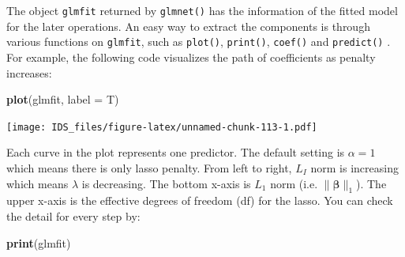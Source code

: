 \documentclass[12pt,]{krantz}
\makeatletter
\newenvironment{Shaded}{\begin{snugshade}}{\end{snugshade}}
\newcommand{\CommentTok}[1]{\textcolor[rgb]{0.37,0.37,0.37}{\textit{#1}}}
\newcommand{\DataTypeTok}[1]{\textcolor[rgb]{0.27,0.27,0.27}{#1}}
\newcommand{\DecValTok}[1]{\textcolor[rgb]{0.06,0.06,0.06}{#1}}
\newcommand{\KeywordTok}[1]{\textcolor[rgb]{0.27,0.27,0.27}{\textbf{#1}}}
\newcommand{\NormalTok}[1]{#1}
\newcommand{\OperatorTok}[1]{\textcolor[rgb]{0.43,0.43,0.43}{\textbf{#1}}}
\newcommand{\StringTok}[1]{\textcolor[rgb]{0.5,0.5,0.5}{#1}}
\newenvironment{kframe}{%
\medskip{}
\setlength{\fboxsep}{.8em}
 \def\at@end@of@kframe{}%
 \ifinner\ifhmode%
  \def\at@end@of@kframe{\end{minipage}}%
  \begin{minipage}{\columnwidth}%
 \fi\fi%
 \def\FrameCommand##1{\hskip\@totalleftmargin \hskip-\fboxsep
 \colorbox{shadecolor}{##1}\hskip-\fboxsep
     \hskip-\linewidth \hskip-\@totalleftmargin \hskip\columnwidth}%
 \MakeFramed {\advance\hsize-\width
   \@totalleftmargin\z@ \linewidth\hsize
   \@setminipage}}%
 {\par\unskip\endMakeFramed%
 \at@end@of@kframe}
\renewenvironment{Shaded}{\begin{kframe}}{\end{kframe}}
\makeatother
\begin{document}
\begin{Shaded}
\end{Shaded}

The object \texttt{glmfit} returned by \texttt{glmnet()} has the information of the fitted model for the later operations. An easy way to extract the components is through various functions on \texttt{glmfit}, such as \texttt{plot()}, \texttt{print()}, \texttt{coef()} and \texttt{predict()} . For example, the following code visualizes the path of coefficients as penalty increases:

\begin{Shaded}
\begin{Highlighting}[]
\KeywordTok{plot}\NormalTok{(glmfit, }\DataTypeTok{label =}\NormalTok{ T)}
\end{Highlighting}
\end{Shaded}

\texttt{[image: IDS\_files/figure-latex/unnamed-chunk-113-1.pdf]}

Each curve in the plot represents one predictor. The default setting is \(\alpha=1\) which means there is only lasso penalty. From left to right, \(L_I\) norm is increasing which means \(\lambda\) is decreasing. The bottom x-axis is \(L_1\) norm (i.e. \(\parallel\mathbf{\beta}\parallel_{1}\)). The upper x-axis is the effective degrees of freedom (df) for the lasso. You can check the detail for every step by:

\begin{Shaded}
\begin{Highlighting}[]
\KeywordTok{print}\NormalTok{(glmfit)}
\end{Highlighting}
\end{Shaded}
\end{document}
